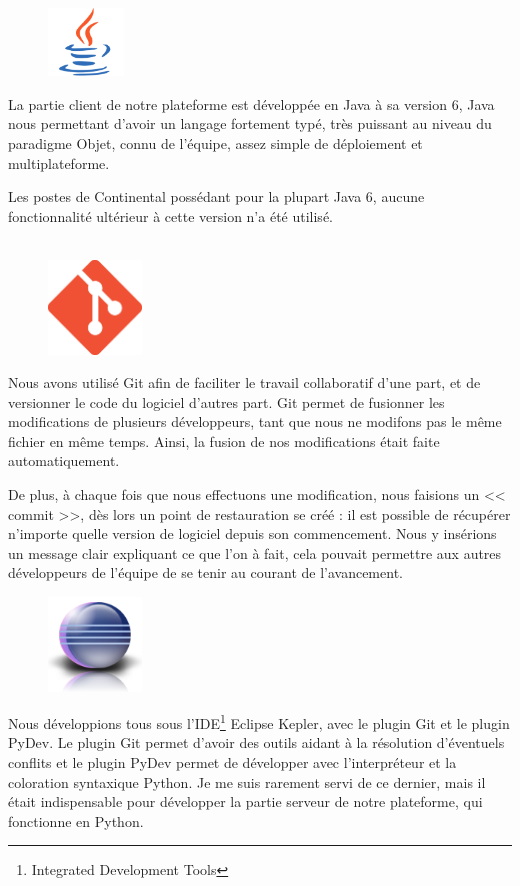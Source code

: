 \begin{figure}
	\includegraphics[width=2cm]{contents/images/logoJava.png}
\end{figure}
La partie client de notre plateforme est développée en Java à sa version 6, Java nous permettant d'avoir un langage fortement typé, très puissant au niveau du paradigme Objet, connu de l'équipe, assez simple de déploiement et multiplateforme. 

Les postes de Continental possédant pour la plupart Java 6, aucune fonctionnalité ultérieur à cette version n'a été utilisé.\\~

\begin{figure}
	\includegraphics[width=2.5cm]{contents/images/logoGit.png}
\end{figure}
Nous avons utilisé Git afin de faciliter le travail collaboratif d'une part, et de versionner le code du logiciel d'autres part. Git permet de fusionner les modifications de plusieurs développeurs, tant que nous ne modifons pas le même fichier en même temps. Ainsi, la fusion de nos modifications était faite automatiquement. 

De plus, à chaque fois que nous effectuons une modification, nous faisions un << commit >>, dès lors un point de restauration se créé : il est possible de récupérer n'importe quelle version de logiciel depuis son commencement. Nous y insérions un message clair expliquant ce que l'on à fait, cela pouvait permettre aux autres développeurs de l'équipe de se tenir au courant de l'avancement.

\begin{figure}
	\includegraphics[width=2.5cm]{contents/images/logoEclipse.png}
\end{figure}
Nous développions tous sous l'IDE\footnote{Integrated Development Tools} Eclipse Kepler, avec le plugin Git et le plugin PyDev. Le plugin Git permet d’avoir des outils aidant à la résolution d’éventuels conflits et le plugin PyDev permet de développer avec l’interpréteur et la coloration syntaxique Python. Je me suis rarement servi de ce dernier, mais il était indispensable pour développer la partie serveur de notre plateforme, qui fonctionne en Python. 

